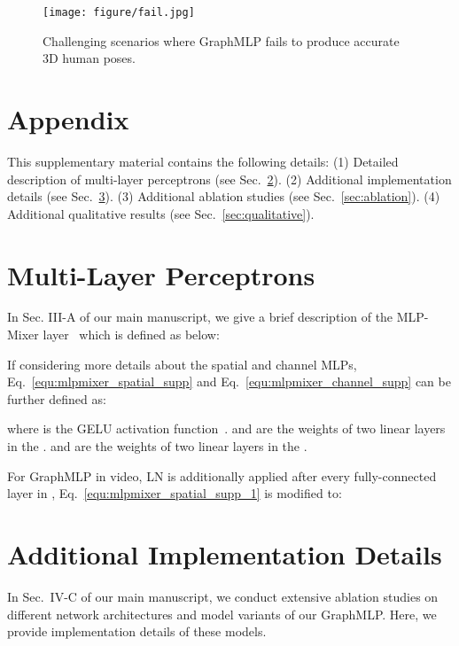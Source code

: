 \documentclass[lettersize,journal]{IEEEtran}
\begin{document}
\begin{figure}[t]
  \centering
  \texttt{[image: figure/fail.jpg]}
  \caption
  {
    Challenging scenarios where GraphMLP fails to produce accurate 3D human poses.
  }
  \label{fig:fail}
\end{figure}




\newpage
\section{Appendix}

This supplementary material contains the following details:
(1) Detailed description of multi-layer perceptrons (see Sec.~\ref{sec:mlp}). 
(2) Additional implementation details (see Sec.~\ref{sec:details}). 
(3) Additional ablation studies (see Sec.~\ref{sec:ablation}).
(4) Additional qualitative results (see Sec.~\ref{sec:qualitative}). 

\section{Multi-Layer Perceptrons}
\label{sec:mlp}
In Sec. III-A of our main manuscript, we give a brief description of the MLP-Mixer layer~\cite{mlpmixer} which is defined as below:


If considering more details about the spatial and channel MLPs, Eq.~\eqref{equ:mlpmixer_spatial_supp} and Eq.~\eqref{equ:mlpmixer_channel_supp} can be further defined as:

where  is the GELU activation function~\cite{hendrycks2016gaussian}.
 and  are the weights of two linear layers in the . 
 and  are the weights of two linear layers in the . 

For GraphMLP in video, LN is additionally applied after every fully-connected layer in , Eq.~\eqref{equ:mlpmixer_spatial_supp_1} is modified to:


\section{Additional Implementation Details}
\label{sec:details}
In Sec.~IV-C of our main manuscript, we conduct extensive ablation studies on different network architectures and model variants of our GraphMLP. 
Here, we provide implementation details of these models. 
\end{document}
